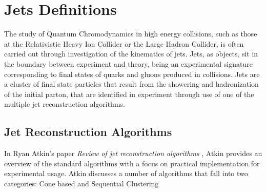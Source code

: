 %
\section{Jets Definitions}
The study of Quantum Chromodynamics in high energy collisions, such as those at the Relativistic Heavy Ion Collider or the Large Hadron Collider, is often carried out through investigation of the kinematics of jets.
Jets, as objects, sit in the boundary between experiment and theory, being an experimental signature corresponding to final states of quarks and gluons produced in collisions. 
Jets are a cluster of final state particles that result from the showering and hadronization of the initial parton, that are identified in experiment through use of one of the multiple jet reconstruction algorithms. 
\subsection{Jet Reconstruction Algorithms}
In Ryan Atkin's paper \textit{Review of jet reconstruction algorithms} \cite{Atkin2015}, Atkin provides an overview of the standard algorithms with a focus on practical implementation for experimental usage. %
Atkin discusses a number of algorithms that fall into two categories: Cone based and Sequential Clustering 
